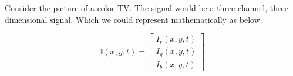 Consider the picture of a color TV. The signal would be a three channel, three dimensional signal. Which we could represent mathematically as below.

\begin{displaymath}
	\mathbb{I}\left( x,y,t \right) = \begin{bmatrix}
	I_r\left(x,y,t\right) \\ I_g\left(x,y,t\right) \\ I_b\left(x,y,t\right)
	\end{bmatrix}
\end{displaymath}

	 
